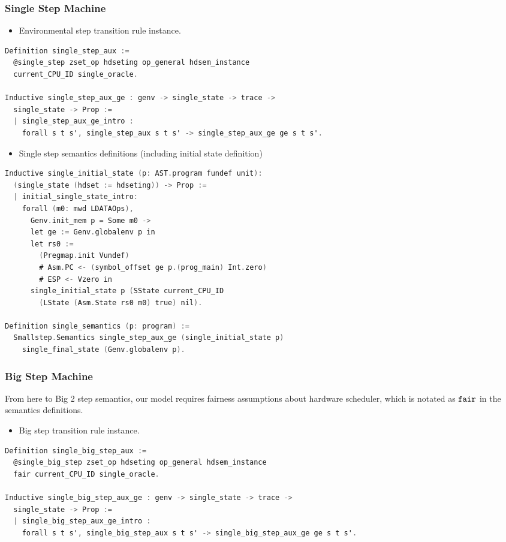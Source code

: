 \subsubsection{Single Step Machine}    
\begin{itemize}[leftmargin=*]
\item Environmental step transition rule instance.
\end{itemize}
\begin{lstlisting}[language=C]
Definition single_step_aux :=
  @single_step zset_op hdseting op_general hdsem_instance 
  current_CPU_ID single_oracle.

Inductive single_step_aux_ge : genv -> single_state -> trace -> 
  single_state -> Prop :=
  | single_step_aux_ge_intro : 
    forall s t s', single_step_aux s t s' -> single_step_aux_ge ge s t s'.
\end{lstlisting}


\begin{itemize}[leftmargin=*]
\item Single step semantics definitions (including initial state definition)
\end{itemize}
\begin{lstlisting}[language=C]
Inductive single_initial_state (p: AST.program fundef unit): 
  (single_state (hdset := hdseting)) -> Prop :=
  | initial_single_state_intro: 
    forall (m0: mwd LDATAOps),
      Genv.init_mem p = Some m0 ->
      let ge := Genv.globalenv p in
      let rs0 :=
        (Pregmap.init Vundef)
        # Asm.PC <- (symbol_offset ge p.(prog_main) Int.zero)
        # ESP <- Vzero in
      single_initial_state p (SState current_CPU_ID 
        (LState (Asm.State rs0 m0) true) nil).

Definition single_semantics (p: program) :=
  Smallstep.Semantics single_step_aux_ge (single_initial_state p) 
    single_final_state (Genv.globalenv p).
\end{lstlisting}

\subsubsection{Big Step Machine}
From here to Big 2 step semantics,
our model requires fairness assumptions about hardware scheduler, which is notated as ${\mathrm{\texttt{fair}}}$ in the semantics definitions.
\begin{itemize}[leftmargin=*]
\item Big step transition rule instance.
\end{itemize}
\begin{lstlisting}[language=C]
Definition single_big_step_aux :=
  @single_big_step zset_op hdseting op_general hdsem_instance 
  fair current_CPU_ID single_oracle.

Inductive single_big_step_aux_ge : genv -> single_state -> trace -> 
  single_state -> Prop :=
  | single_big_step_aux_ge_intro : 
    forall s t s', single_big_step_aux s t s' -> single_big_step_aux_ge ge s t s'.
\end{lstlisting}


